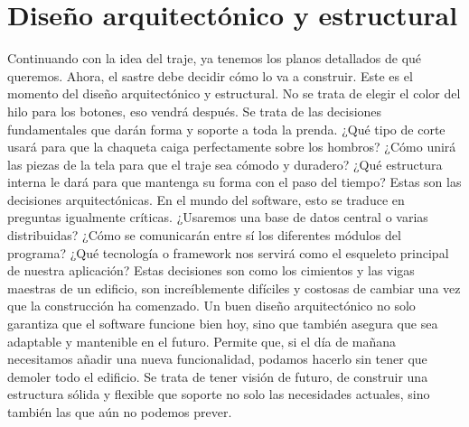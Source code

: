 \section{Diseño arquitectónico y estructural}
Continuando con la idea del traje, ya tenemos los planos detallados de qué queremos. Ahora, el sastre debe decidir cómo lo va a construir. Este es el momento del diseño arquitectónico y estructural.
No se trata de elegir el color del hilo para los botones, eso vendrá después. Se trata de las decisiones fundamentales que darán forma y soporte a toda la prenda. ¿Qué tipo de corte usará para que la chaqueta caiga perfectamente sobre los hombros? ¿Cómo unirá las piezas de la tela para que el traje sea cómodo y duradero? ¿Qué estructura interna le dará para que mantenga su forma con el paso del tiempo? Estas son las decisiones arquitectónicas.
En el mundo del software, esto se traduce en preguntas igualmente críticas. ¿Usaremos una base de datos central o varias distribuidas? ¿Cómo se comunicarán entre sí los diferentes módulos del programa? ¿Qué tecnología o framework nos servirá como el esqueleto principal de nuestra aplicación? Estas decisiones son como los cimientos y las vigas maestras de un edificio, son increíblemente difíciles y costosas de cambiar una vez que la construcción ha comenzado.
Un buen diseño arquitectónico no solo garantiza que el software funcione bien hoy, sino que también asegura que sea adaptable y mantenible en el futuro. Permite que, si el día de mañana necesitamos añadir una nueva funcionalidad, podamos hacerlo sin tener que demoler todo el edificio. Se trata de tener visión de futuro, de construir una estructura sólida y flexible que soporte no solo las necesidades actuales, sino también las que aún no podemos prever.
